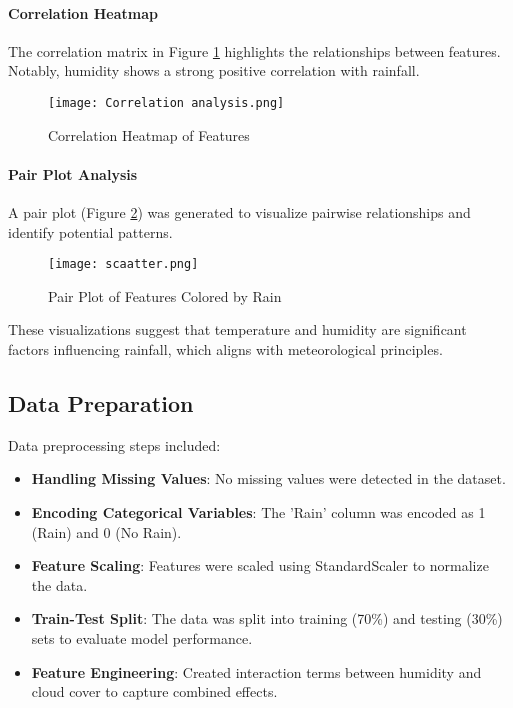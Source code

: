 \documentclass[12pt]{article}
\begin{document}
\paragraph{Correlation Heatmap}
The correlation matrix in Figure \ref{fig:correlation_heatmap} highlights the relationships between features. Notably, humidity shows a strong positive correlation with rainfall.

\begin{figure}[H]
    \centering
    \texttt{[image: Correlation analysis.png]}
    \caption{Correlation Heatmap of Features}
    \label{fig:correlation_heatmap}
\end{figure}

\paragraph{Pair Plot Analysis}
A pair plot (Figure \ref{fig:pair_plot}) was generated to visualize pairwise relationships and identify potential patterns.

\begin{figure}[H]
    \centering
    \texttt{[image: scaatter.png]}
    \caption{Pair Plot of Features Colored by Rain}
    \label{fig:pair_plot}
\end{figure}

These visualizations suggest that temperature and humidity are significant factors influencing rainfall, which aligns with meteorological principles.

\subsection{Data Preparation}
Data preprocessing steps included:

\begin{itemize}
    \item \textbf{Handling Missing Values}: No missing values were detected in the dataset.
    \item \textbf{Encoding Categorical Variables}: The 'Rain' column was encoded as 1 (Rain) and 0 (No Rain).
    \item \textbf{Feature Scaling}: Features were scaled using StandardScaler to normalize the data.
    \item \textbf{Train-Test Split}: The data was split into training (70\%) and testing (30\%) sets to evaluate model performance.
    \item \textbf{Feature Engineering}: Created interaction terms between humidity and cloud cover to capture combined effects.
\end{itemize}
\end{document}
